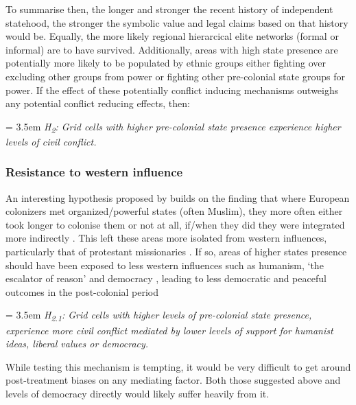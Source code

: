 \documentclass[12pt]{article}
\begin{document}
To summarise then, the longer and stronger the recent history of independent
statehood, the stronger the symbolic value and legal claims based on that
history would be. Equally, the more likely regional hierarcical elite networks
(formal or informal) are to have survived. Additionally, areas with high state
presence are potentially more likely to be populated by ethnic groups either
fighting over excluding other groups from power or fighting other pre-colonial
state groups for power. If the effect of these potentially conflict inducing
mechanisms outweighs any potential conflict reducing effects, then:

\bigskip

\hangindent = 3.5em \textit{H\textsubscript{2}: Grid cells with higher
pre-colonial state presence experience higher levels of civil conflict.}

\bigskip 

\subsubsection{Resistance to western influence}

An interesting hypothesis proposed by \citet{Wishman} builds on the finding that
where European colonizers met organized/powerful states (often Muslim), they
more often either took longer to colonise them or not at all, if/when they did
they were integrated more indirectly \citep{Gerring2011, Hariri2012,
Englebert2000}. This left these areas more isolated from western influences,
particularly that of protestant missionaries \citep{Woodberry2012}. If so, areas
of higher states presence should have been exposed to less western influences
such as humanism, `the escalator of reason' \citep{Pinker2012} and democracy
\citep{Woodberry2012, Hariri2012}, leading to less democratic and peaceful
outcomes in the post-colonial period \citep{Hegre2006}

\bigskip

\hangindent = 3.5em \textit{H\textsubscript{2.1}: Grid cells with higher levels
of pre-colonial state presence, experience more civil conflict mediated by lower
levels of support for humanist ideas, liberal values or democracy.}

\bigskip

While testing this mechanism is tempting, it would be very difficult to get
around post-treatment biases on any mediating factor. Both those suggested above
and levels of democracy directly would likely suffer heavily from it.
\end{document}
